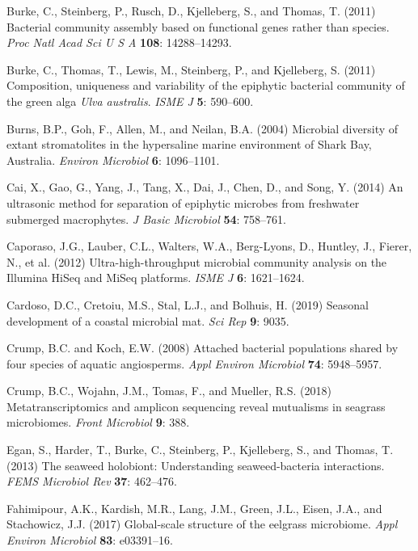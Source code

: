 \documentclass[12pt,]{article}
\begin{document}
\leavevmode\hypertarget{ref-Burke2011}{}%
Burke, C., Steinberg, P., Rusch, D., Kjelleberg, S., and Thomas, T.
(2011) Bacterial community assembly based on functional genes rather
than species. \emph{Proc Natl Acad Sci U S A} \textbf{108}:
14288--14293.

\leavevmode\hypertarget{ref-Burke2011a}{}%
Burke, C., Thomas, T., Lewis, M., Steinberg, P., and Kjelleberg, S.
(2011) Composition, uniqueness and variability of the epiphytic
bacterial community of the green alga \emph{Ulva australis}. \emph{ISME
J} \textbf{5}: 590--600.

\leavevmode\hypertarget{ref-Burns2004}{}%
Burns, B.P., Goh, F., Allen, M., and Neilan, B.A. (2004) Microbial
diversity of extant stromatolites in the hypersaline marine environment
of Shark Bay, Australia. \emph{Environ Microbiol} \textbf{6}:
1096--1101.

\leavevmode\hypertarget{ref-Cai2014}{}%
Cai, X., Gao, G., Yang, J., Tang, X., Dai, J., Chen, D., and Song, Y.
(2014) An ultrasonic method for separation of epiphytic microbes from
freshwater submerged macrophytes. \emph{J Basic Microbiol} \textbf{54}:
758--761.

\leavevmode\hypertarget{ref-Caporaso2012}{}%
Caporaso, J.G., Lauber, C.L., Walters, W.A., Berg-Lyons, D., Huntley,
J., Fierer, N., et al. (2012) Ultra-high-throughput microbial community
analysis on the Illumina HiSeq and MiSeq platforms. \emph{ISME J}
\textbf{6}: 1621--1624.

\leavevmode\hypertarget{ref-Cardoso2019}{}%
Cardoso, D.C., Cretoiu, M.S., Stal, L.J., and Bolhuis, H. (2019)
Seasonal development of a coastal microbial mat. \emph{Sci Rep}
\textbf{9}: 9035.

\leavevmode\hypertarget{ref-Crump2008}{}%
Crump, B.C. and Koch, E.W. (2008) Attached bacterial populations shared
by four species of aquatic angiosperms. \emph{Appl Environ Microbiol}
\textbf{74}: 5948--5957.

\leavevmode\hypertarget{ref-Crump2018}{}%
Crump, B.C., Wojahn, J.M., Tomas, F., and Mueller, R.S. (2018)
Metatranscriptomics and amplicon sequencing reveal mutualisms in
seagrass microbiomes. \emph{Front Microbiol} \textbf{9}: 388.

\leavevmode\hypertarget{ref-Egan2013}{}%
Egan, S., Harder, T., Burke, C., Steinberg, P., Kjelleberg, S., and
Thomas, T. (2013) The seaweed holobiont: Understanding seaweed-bacteria
interactions. \emph{FEMS Microbiol Rev} \textbf{37}: 462--476.

\leavevmode\hypertarget{ref-Fahimipour2017}{}%
Fahimipour, A.K., Kardish, M.R., Lang, J.M., Green, J.L., Eisen, J.A.,
and Stachowicz, J.J. (2017) Global-scale structure of the eelgrass
microbiome. \emph{Appl Environ Microbiol} \textbf{83}: e03391--16.
\end{document}
